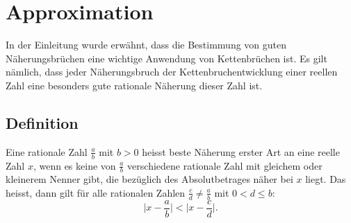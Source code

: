 %
%
%
\section{Approximation
\label{kettenbruch:section:Approximation}}
In der Einleitung wurde erwähnt, dass die Bestimmung von guten
Näherungsbrüchen eine wichtige Anwendung von Kettenbrüchen ist. Es
gilt nämlich, dass jeder Näherungsbruch der Kettenbruchentwicklung
einer reellen Zahl eine besonders gute rationale Näherung dieser
Zahl ist.

\subsection{Definition}
Eine rationale Zahl $\frac{a}{b}$ mit $b>0$ heisst beste Näherung
%
erster Art an eine reelle Zahl $x$, wenn es keine von $\frac{a}{b}$
verschiedene rationale Zahl mit gleichem oder kleinerem Nenner gibt,
die bezüglich des Absolutbetrages näher bei $x$ liegt.
Das heisst, dann gilt für alle rationalen Zahlen $\frac{c}{d} \ne
\frac{a}{b}$ mit $0<d\le b$:
\begin{equation}
\biggl|x-\frac{a}{b}\biggr| < \biggl| x-\frac{c}{d}\biggr|.
\end{equation}


